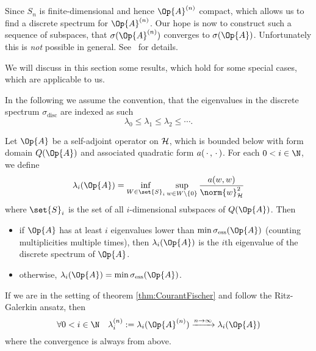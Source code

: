 Since $S_n$ is finite-dimensional and hence $\Op{A}^{(n)}$ compact,
which allows us to find a discrete spectrum for $\Op{A}^{(n)}$.
Our hope is now to construct such a sequence of subspaces,
that $\sigma(\Op{A}^{(n)})$ converges to $\sigma(\Op{A})$.
Unfortunately this is \emph{not} possible in general.
See~\cite{Helffer2013} for details.

We will discuss in this section some results,
which hold for some special cases, which are applicable to us.






In the following we assume the convention,
that the eigenvalues in the discrete spectrum $\sigma_\text{disc}$
are indexed as such
\[ \lambda_0 \leq \lambda_1 \leq \lambda_2 \leq \cdots. \]

\begin{thm}
	\label{thm:CourantFischer}
	Let $\Op{A}$ be a self-adjoint operator on $\mathcal{H}$,
	which is bounded below with form domain $Q(\Op{A})$
	and associated quadratic form $a(\,\cdot\,,\,\cdot\,)$.
	For each $0 < i \in \N$, we define
	\begin{equation}
		\lambda_i(\Op{A}) = \inf_{W \in \set{S}_i} \sup_{w \in W \backslash \{0\}}
		\frac{a(w,w)}{\norm{w}_\hilbert^2}
		\label{eqn:CourantFischer}
	\end{equation}
	where $\set{S}_i$ is the set of all $i$-dimensional subspaces of $Q(\Op{A})$.
	Then
	\begin{itemize}
		\item if $\Op{A}$ has at least $i$ eigenvalues lower
			than $\min \sigma_\text{ess}(\Op{A})$ (counting multiplicities multiple times),
			then $\lambda_i(\Op{A})$ is the $i$th eigenvalue of the discrete spectrum
			of $\Op{A}$.
		\item otherwise, $\lambda_i(\Op{A}) = \min \sigma_\text{ess}(\Op{A})$.
	\end{itemize}
\end{thm}

\begin{thm}
	If we are in the setting of theorem \vref{thm:CourantFischer}
	and follow the Ritz-Galerkin ansatz, then
	\[ \forall 0 < i \in \N \quad \lambda^{(n)}_i := \lambda_i(\Op{A}^{(n)}) \xrightarrow{n\to\infty} \lambda_i(\Op{A}) \]
	where the convergence is always from above.
\end{thm}


